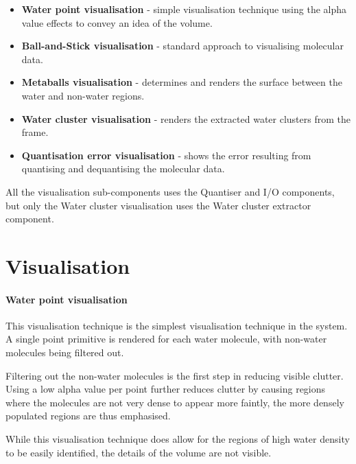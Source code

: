 \begin{itemize}

  \item \textbf{Water point visualisation} - simple visualisation technique
  using the alpha value effects to convey an idea of the volume.

  \item \textbf{Ball-and-Stick visualisation} - standard approach to
  visualising molecular data.

  \item \textbf{Metaballs visualisation} - determines and renders the surface
  between the water and non-water regions.

  \item \textbf{Water cluster visualisation} - renders the extracted water
  clusters from the frame.

  \item \textbf{Quantisation error visualisation} - shows the error resulting
  from quantising and dequantising the molecular data.

\end{itemize}

All the visualisation sub-components uses the Quantiser and I/O components, but
only the Water cluster visualisation uses the Water cluster extractor
component.



\section{Visualisation}
\label{sec:design_visualisation}

\paragraph{Water point visualisation}

This visualisation technique is the simplest visualisation technique in the
system. A single point primitive is rendered for each water molecule, with
non-water molecules being filtered out.

Filtering out the non-water molecules is the first step in reducing visible
clutter. Using a low alpha value per point further reduces clutter by causing
regions where the molecules are not very dense to appear more faintly, the more
densely populated regions are thus emphasised.

While this visualisation technique does allow for the regions of high water
density to be easily identified, the details of the volume are not visible.

